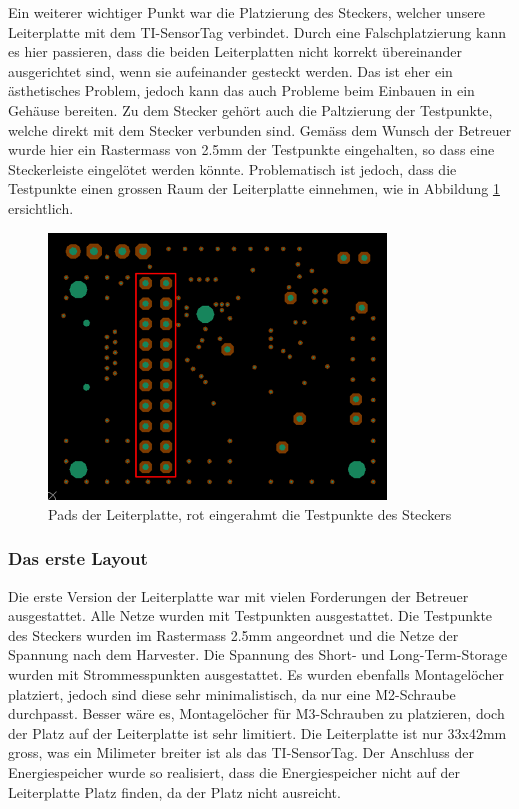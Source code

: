 Ein weiterer wichtiger Punkt war die Platzierung des Steckers, welcher unsere Leiterplatte mit dem TI-SensorTag verbindet. Durch eine Falschplatzierung kann es hier passieren, dass die beiden Leiterplatten nicht korrekt übereinander ausgerichtet sind, wenn sie aufeinander gesteckt werden. Das ist eher ein ästhetisches Problem, jedoch kann das auch Probleme beim Einbauen in ein Gehäuse bereiten. Zu dem Stecker gehört auch die Paltzierung der Testpunkte, welche direkt mit dem Stecker verbunden sind. Gemäss dem Wunsch der Betreuer wurde hier ein Rastermass von 2.5mm der Testpunkte eingehalten, so dass eine Steckerleiste eingelötet werden könnte. Problematisch ist jedoch, dass die Testpunkte einen grossen Raum der Leiterplatte einnehmen, wie in Abbildung \ref{layout_testpunkteraster} ersichtlich.

\begin{figure}[ht]
    \includegraphics[width=0.8\textwidth]{3Vorgehen/imag/Layout_Testpunkteraster.png}
    \caption{Pads der Leiterplatte, rot eingerahmt die Testpunkte des Steckers}\label{layout_testpunkteraster} 
\end{figure}

\subsubsection{Das erste Layout}

Die erste Version der Leiterplatte war mit vielen Forderungen der Betreuer ausgestattet. Alle Netze wurden mit Testpunkten ausgestattet. Die Testpunkte des Steckers wurden im Rastermass 2.5mm angeordnet und die Netze der Spannung nach dem Harvester. Die Spannung des Short- und Long-Term-Storage wurden mit Strommesspunkten ausgestattet. Es wurden ebenfalls Montagelöcher platziert, jedoch sind diese sehr minimalistisch, da nur eine M2-Schraube durchpasst. Besser wäre es, Montagelöcher für M3-Schrauben zu platzieren, doch der Platz auf der Leiterplatte ist sehr limitiert. Die Leiterplatte ist nur 33x42mm gross, was ein Milimeter breiter ist als das TI-SensorTag. Der Anschluss der Energiespeicher wurde so realisiert, dass die Energiespeicher nicht auf der Leiterplatte Platz finden, da der Platz nicht ausreicht.

